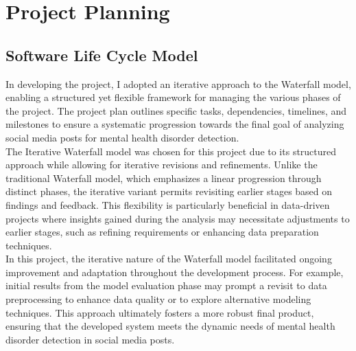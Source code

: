 
\section{Project Planning}

\subsection{Software Life Cycle Model}
\noindent
In developing the project, I adopted an iterative approach to the Waterfall model, enabling a structured yet flexible framework for managing the various phases of the project. The project plan outlines specific tasks, dependencies, timelines, and milestones to ensure a systematic progression towards the final goal of analyzing social media posts for mental health disorder detection. \\

\noindent
The Iterative Waterfall model was chosen for this project due to its structured approach while allowing for iterative revisions and refinements. Unlike the traditional Waterfall model, which emphasizes a linear progression through distinct phases, the iterative variant permits revisiting earlier stages based on findings and feedback. This flexibility is particularly beneficial in data-driven projects where insights gained during the analysis may necessitate adjustments to earlier stages, such as refining requirements or enhancing data preparation techniques. \\

\noindent
In this project, the iterative nature of the Waterfall model facilitated ongoing improvement and adaptation throughout the development process. For example, initial results from the model evaluation phase may prompt a revisit to data preprocessing to enhance data quality or to explore alternative modeling techniques. This approach ultimately fosters a more robust final product, ensuring that the developed system meets the dynamic needs of mental health disorder detection in social media posts. \\

